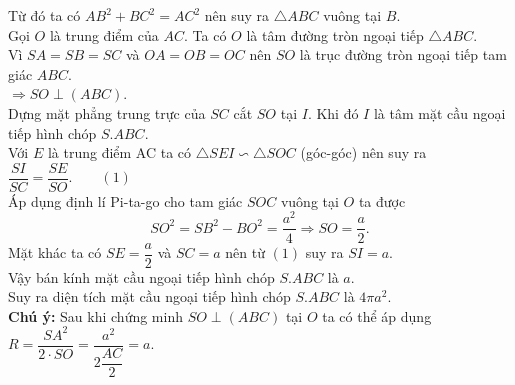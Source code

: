 \begin{ex}
{{
		}
		\noindent Từ đó ta có $AB^2+BC^2=AC^2$ nên suy ra $\triangle ABC$ vuông tại $B$.\\
		Gọi $O$ là trung điểm của $AC$. Ta có $O$ là tâm đường tròn ngoại tiếp $\triangle ABC$.\\
		Vì $SA=SB=SC$ và $OA=OB=OC$ nên $SO$ là trục đường tròn ngoại tiếp tam giác $ABC$.\\
		$\Rightarrow SO\perp (ABC)$.\\
		Dựng mặt phẳng trung trực của $SC$ cắt $SO$ tại $I$. Khi đó $I$ là tâm mặt cầu ngoại tiếp hình chóp $S.ABC$.\\
		Với $E$ là trung điểm AC ta có $\triangle SEI\backsim\triangle SOC$ (góc-góc) nên suy ra $\dfrac{SI}{SC}=\dfrac{SE}{SO}.\qquad (1)$\\
		Áp dụng định lí Pi-ta-go cho tam giác $SOC$ vuông tại $O$ ta được
		\[SO^2=SB^2-BO^2=\dfrac{a^2}{4}\Rightarrow SO=\dfrac{a}{2}.\]
		Mặt khác ta có $SE=\dfrac{a}{2}$ và $SC=a$ nên từ $(1)$ suy ra $SI=a$.\\
		Vậy bán kính mặt cầu ngoại tiếp hình chóp $S.ABC$ là $a$.\\
		Suy ra diện tích mặt cầu ngoại tiếp hình chóp $S.ABC$ là $4\pi a^2$.\\
		\textbf{Chú ý:} Sau khi chứng minh $SO\perp (ABC)$ tại $O$ ta có thể áp dụng $R=\dfrac{SA^2}{2\cdot SO}=\dfrac{a^2}{2\dfrac{AC}{2}}=a$.
	}
\end{ex}

